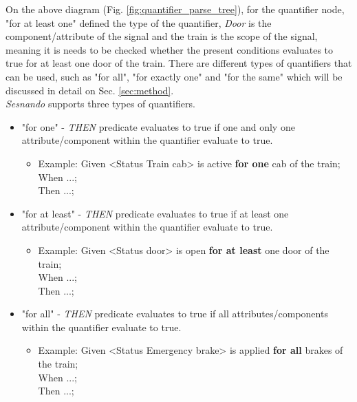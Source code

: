 On the above diagram (Fig. \ref{fig:quantifier_parse_tree}), for the quantifier node, "for at least one" defined the type of the quantifier, \textit{Door} is the component/attribute of the signal and the train is the scope of the signal, meaning it is needs to be checked whether the present conditions evaluates to true for at least one door of the train. There are different types of quantifiers that can be used, such as "for all", "for exactly one" and "for the same" which will be discussed in detail on Sec. \ref{sec:method}.\\

\textit{Sesnando} supports three types of quantifiers.
\begin{itemize}
    \item "for one" - \textit{THEN} predicate evaluates to true if one and only one attribute/component within the quantifier evaluate to true.
        \begin{itemize}
            \item Example: Given <Status Train cab> is active \textbf{for one} cab of the train;\\
            When ...;\\
            Then ...;\\
        \end{itemize}
    \item "for at least" - \textit{THEN} predicate evaluates to true if at least one attribute/component within the quantifier evaluate to true.
        \begin{itemize}
            \item Example: Given <Status door> is open \textbf{for at least} one door of the train;\\
            When ...;\\
            Then ...;\\
        \end{itemize}
    \item "for all" - \textit{THEN} predicate evaluates to true if all attributes/components within
    the quantifier evaluate to true.
        \begin{itemize}
            \item Example: Given <Status Emergency brake> is applied \textbf{for all} brakes of the train;\\
            When ...;\\
            Then ...;\\
        \end{itemize}
\end{itemize}

